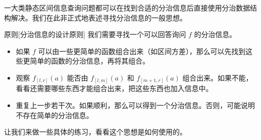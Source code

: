 一大类静态区间信息查询问题都可以在找到合适的分治信息后直接使用分治数据结构解决。我们在此非正式地表述寻找分治信息的一般思想。 

\begin{descbox}{原则}[分治信息的设计原则]\label{desc: design divide-and-conquer information}
    我们需要寻找一个可以回答询问 $f$ 的分治信息。
    \begin{itemize}
        \item 如果 $f$ 可以由一些更简单的函数组合出来（如区间方差），那么可以先找到这些更简单的函数的分治信息，再将其组合。
        \item 观察 $f_{[l,r]}(a)$ 能否由 $f_{[l,m]}(a)$ 和 $f_{[m+1,r]}(a)$ 组合出来。如果不能，看看还需要哪些东西才能组合出来，把这些东西也加入信息中。
        \item 重复上一步若干次。如果顺利，那么可以得到一个分治信息。否则，可能说明不存在简单的分治信息。
    \end{itemize}
\end{descbox}

让我们来做一些具体的练习，看看这个思想是如何使用的。

